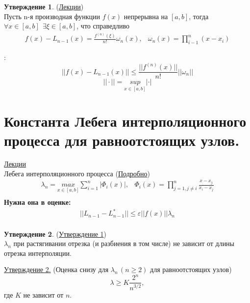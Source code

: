 \documentclass[specialist, subf, href, colorlinks=true, 12pt, times, mtpro, final]{disser}
\theoremstyle{definition}
\newtheorem{state}{Утверждение}[section]
\begin{document}
    \begin{state} (\hyperlink {lects.16}{Лекции})\\
    Пусть n-я производная функции $f(x)$ непрерывна на $[a,b]$, тогда $\forall x \in [a,b] \ \  \exists \xi \in [a,b]$, что справедливо
        $$
            \begin{array}{lr}
            f(x) - L_{n-1}(x) = \frac {f^{(n)}(\xi)}{n!} \omega_n(x), & \omega_n(x) = \prod\limits_{i - 1}^{n}(x-x_i)
            \end{array}
        $$
    \end{state}
    :
    $$
        ||f(x) - L_{n-1}(x) || \le \frac{||f^{(n)}(x)||}{n!} ||\omega_n||
    $$
    $$
        ||\cdot|| = \underset{x\in [a,b]}{sup} |\cdot|
    $$


\section {Константа Лебега интерполяционного процесса для равноотстоящих узлов.}
    \hyperlink {lects.17}{Лекции}\\
    { Лебега интерполяционного процесса} (\hyperlink {lects.17}{Подробно})
    $$
        \begin{array}{lr}
        \lambda_n = \underset{x\in [a,b]}{max} \sum\limits_{i = 1}^n |\Phi_i(x)|, & \Phi_i(x) = \prod\limits_{j = 1, j\ne i}^{n} \frac{x-x_j}{x_i - x_j} \\
        \end{array}
    $$
    \textbf{Нужна она в оценке:}
    $$
        \begin{array}{lr}
        ||L_{n-1} - L_{n-1}^*|| \le \varepsilon ||f(x)|| \lambda_n \\
        \end{array}
    $$
    
    \begin{state} (\hyperlink {lects.17}{Утверждение 1})\\
    $\lambda_n$ при растягивании отрезка (и разбиения в том числе) не зависит от длины отрезка интерполяции.
    \end{state}
    
    \noindent \hyperlink{lects.17}{Утверждение 2.} (Оценка снизу для $\lambda_n\,(n\ge 2)$ для равноотстоящих узлов)
    $$
        \lambda \ge K \frac {2^n}{n^{3/2}}, 
    $$ 
    где $K$ не зависит от $n$. \\
    
\end{document}
